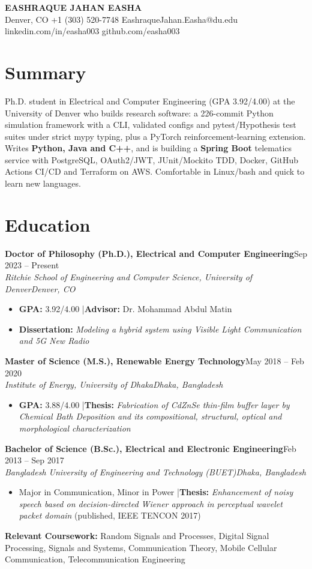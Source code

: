 \documentclass[10pt,letterpaper]{article}
\newcommand{\entry}[4]{\textbf{#1}\hfill #2\\\textit{#3}\hfill\textit{#4}\par}
\begin{document}
\begin{center}{\LARGE\bfseries\color{accent} EASHRAQUE JAHAN EASHA}\\[3pt]
Denver, CO \textbar{} +1 (303) 520-7748 \textbar{} EashraqueJahan.Easha@du.edu \textbar{} linkedin.com/in/easha003 \textbar{} github.com/easha003\end{center}\vspace{-6pt}
\section*{Summary}
Ph.D. student in Electrical and Computer Engineering (GPA 3.92/4.00) at the University of Denver who builds research software: a 226-commit Python simulation framework with a CLI, validated configs and pytest/Hypothesis test suites under strict mypy typing, plus a PyTorch reinforcement-learning extension. Writes \textbf{Python, Java and C++}, and is building a \textbf{Spring Boot} telematics service with PostgreSQL, OAuth2/JWT, JUnit/Mockito TDD, Docker, GitHub Actions CI/CD and Terraform on AWS. Comfortable in Linux/bash and quick to learn new languages.
\section*{Education}
\entry{Doctor of Philosophy (Ph.D.), Electrical and Computer Engineering}{Sep 2023 – Present}{Ritchie School of Engineering and Computer Science, University of Denver}{Denver, CO}
\begin{itemize}\item \textbf{GPA:} 3.92/4.00 \quad|\quad \textbf{Advisor:} Dr. Mohammad Abdul Matin\item \textbf{Dissertation:} \textit{Modeling a hybrid system using Visible Light Communication and 5G New Radio}\end{itemize}
\vspace{2pt}
\entry{Master of Science (M.S.), Renewable Energy Technology}{May 2018 – Feb 2020}{Institute of Energy, University of Dhaka}{Dhaka, Bangladesh}
\begin{itemize}\item \textbf{GPA:} 3.88/4.00 \quad|\quad \textbf{Thesis:} \textit{Fabrication of CdZnSe thin-film buffer layer by Chemical Bath Deposition and its compositional, structural, optical and morphological characterization}\end{itemize}
\vspace{2pt}
\entry{Bachelor of Science (B.Sc.), Electrical and Electronic Engineering}{Feb 2013 – Sep 2017}{Bangladesh University of Engineering and Technology (BUET)}{Dhaka, Bangladesh}
\begin{itemize}\item Major in Communication, Minor in Power \quad|\quad \textbf{Thesis:} \textit{Enhancement of noisy speech based on decision-directed Wiener approach in perceptual wavelet packet domain} (published, IEEE TENCON 2017)\end{itemize}
\vspace{2pt}
\textbf{Relevant Coursework:} Random Signals and Processes, Digital Signal Processing, Signals and Systems, Communication Theory, Mobile Cellular Communication, Telecommunication Engineering
\end{document}
